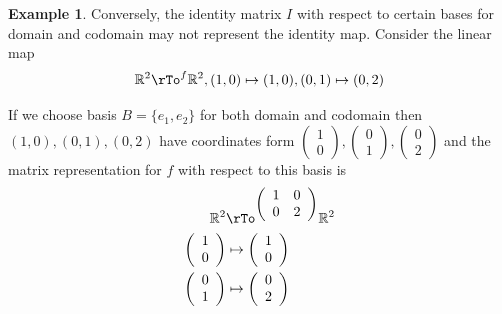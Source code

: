\documentclass[12pt]{amsart}
\theoremstyle{definition}
\newtheorem{example}[theorem]{Example}
\begin{document}
\begin{example} Conversely, the identity matrix $I$ with respect to certain bases for domain and codomain may not represent the identity map. Consider the linear map
$$\mathbb{R}^2 \rTo^f \mathbb{R}^2, (1, 0) \mapsto (1, 0), (0, 1) \mapsto (0, 2)$$

If we choose basis $B = \{e_1, e_2\}$ for both domain and codomain then $(1,0), (0,1), (0,2)$ have coordinates form $\left( \begin{array}{c} 1 \\ 0 \end{array}\right), \left( \begin{array}{c} 0 \\ 1 \end{array}\right), \left( \begin{array}{c} 0 \\ 2 \end{array}\right)$ and the matrix representation for $f$ with respect to this basis is
\begin{align*}
\mathbb{R}^2 & \rTo^{\left( \begin{array}{cc} 1 & 0 \\ 0 & 2 \end{array}\right)} \mathbb{R}^2 \\
\left( \begin{array}{c} 1 \\ 0 \end{array}\right) & \mapsto \left( \begin{array}{c} 1 \\ 0 \end{array}\right) \\ \left( \begin{array}{c} 0 \\ 1 \end{array}\right) & \mapsto \left( \begin{array}{c} 0 \\ 2 \end{array}\right)
\end{align*}


\end{example}
\end{document}
